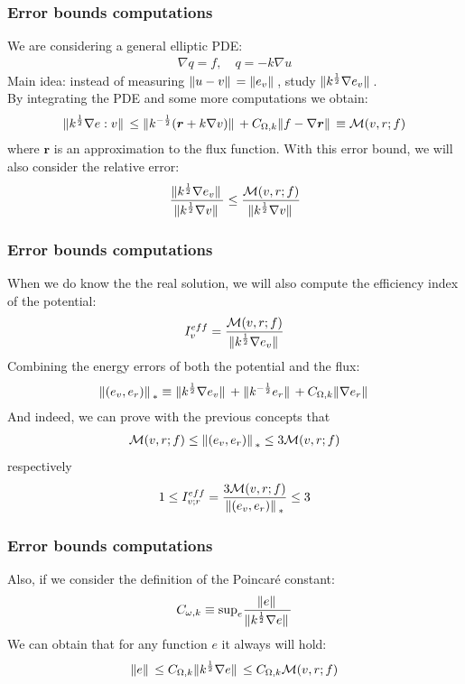 \documentclass[t]{beamer}
\begin{document}
\begin{frame}
\frametitle{Error bounds computations}
We are considering a general elliptic PDE:
\begin{align*}
\nabla q = f , \quad q =-k \nabla u
\end{align*}
Main idea: instead of measuring $\norm*{u-v} = \norm*{e_v}$, study $\norm*{k^{\frac{1}{2}}\nabla e_v}$. 
\\ By integrating the PDE and some more computations we obtain:
\begin{align*}
\norm*{k^{\frac{1}{2}}\nabla e:v} \leq \norm*{k^{-\frac{1}{2}}(\bm{r}+k\nabla v)} + C_{\Omega,k}\norm*{f-\nabla \bm{r}} \equiv \mathcal{M}(v,r;f)
\end{align*}
where $\bm{r}$ is an approximation to the flux function.
With this error bound, we will also consider the \alert{relative error}:
\begin{align*}
\frac{\norm*{k^{\frac{1}{2}}\nabla e_v}}{\norm*{k^{\frac{1}{2}}\nabla v}} \leq \frac{\mathcal{M}(v,r;f)}{\norm*{k^{\frac{1}{2}}\nabla v}}
\end{align*}

\end{frame}

\begin{frame}
\frametitle{Error bounds computations}
When we do know the the real solution, we will also compute the \alert{efficiency index of the potential}:
\begin{align*}
I^{eff}_v = \frac{\mathcal{M}(v,r;f)}{\norm*{k^{\frac{1}{2}}\nabla e_v}}
\end{align*}
Combining the energy errors of both the potential and the flux:
\begin{align*}
\norm*{(e_v,e_r)}_{*} \equiv \norm*{k^{\frac{1}{2}}\nabla e_v} + \norm*{k^{-\frac{1}{2}}e_r} + C_{\Omega,k}\norm*{\nabla e_r}
\end{align*} 
And indeed, we can prove with the previous concepts that 
\begin{align*}
\mathcal{M}(v,r;f) \leq  \norm*{(e_v,e_r)}_{*}  \leq 3\mathcal{M}(v,r;f)
\end{align*}
respectively
\begin{align*}
1 \leq I^{eff}_{v;r} = \frac{3\mathcal{M}(v,r;f)}{\norm*{(e_v, e_r)}_*} \leq 3
\end{align*}
\end{frame}

\begin{frame}
\frametitle{Error bounds computations}
Also, if we consider the definition of the Poincaré constant:
\begin{align*}
C_{\omega,k} \equiv \mathrm{sup}_e \frac{\norm*{e}}{\norm*{k^{\frac{1}{2}}\nabla{e}}}
\end{align*}
We can obtain that for any function $e$ it always will hold:
\begin{align*}
\norm*{e} \leq C_{\Omega,k}\norm*{k^{\frac{1}{2}}\nabla{e}} \leq C_{\Omega,k}\mathcal{M}(v,r;f)
\end{align*}
\end{frame}
\end{document}
